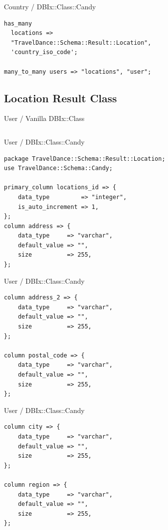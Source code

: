 \begin{frame}[fragile]{Country / DBIx::Class::Candy}
\begin{lstlisting}
has_many
  locations =>
  "TravelDance::Schema::Result::Location",
  'country_iso_code';

many_to_many users => "locations", "user";
\end{lstlisting}
\end{frame}

\subsection{Location Result Class}

\begin{frame}[fragile]{User / Vanilla DBIx::Class}
\begin{lstlisting}

\end{lstlisting}
\end{frame}

\begin{frame}[fragile]{User / DBIx::Class::Candy}
\begin{lstlisting}
package TravelDance::Schema::Result::Location;
use TravelDance::Schema::Candy;

primary_column locations_id => {
    data_type         => "integer",
    is_auto_increment => 1,
};
column address => {
    data_type     => "varchar",
    default_value => "",
    size          => 255,
};
\end{lstlisting}
\end{frame}

\begin{frame}[fragile]{User / DBIx::Class::Candy}
\begin{lstlisting}
column address_2 => {
    data_type     => "varchar",
    default_value => "",
    size          => 255,
};

column postal_code => {
    data_type     => "varchar",
    default_value => "",
    size          => 255,
};
\end{lstlisting}
\end{frame}

\begin{frame}[fragile]{User / DBIx::Class::Candy}
\begin{lstlisting}
column city => {
    data_type     => "varchar",
    default_value => "",
    size          => 255,
};

column region => {
    data_type     => "varchar",
    default_value => "",
    size          => 255,
};
\end{lstlisting}
\end{frame}

